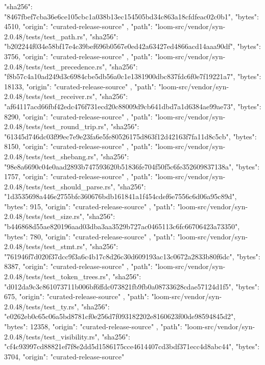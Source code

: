 {{      "sha256": "8467fbef7cba36e6ce105cbc1a038b13ec154505bd34c863a18cfdfeac02c0b1",
      "bytes": 4510,
      "origin": "curated-release-source"
    },
    {
      "path": "loom-src/vendor/syn-2.0.48/tests/test_path.rs",
      "sha256": "b202244f034e58bf17e4c39bef696b0567e0ed42a63427ed4866acd14aaa90df",
      "bytes": 3756,
      "origin": "curated-release-source"
    },
    {
      "path": "loom-src/vendor/syn-2.0.48/tests/test_precedence.rs",
      "sha256": "f8b57c4a10ad249d3c6984cbe5db56a0c1e1381900dbc837fdc6f0e7f19221a7",
      "bytes": 18133,
      "origin": "curated-release-source"
    },
    {
      "path": "loom-src/vendor/syn-2.0.48/tests/test_receiver.rs",
      "sha256": "af64117acd66fbf42edc476f731ecd20c88009d9cb641dbd7a1d6384ae99ae73",
      "bytes": 8290,
      "origin": "curated-release-source"
    },
    {
      "path": "loom-src/vendor/syn-2.0.48/tests/test_round_trip.rs",
      "sha256": "61345d746dc03f99ec7e9e23fa6e5fe80526175d863f12d42163f7fa11d8c5cb",
      "bytes": 8150,
      "origin": "curated-release-source"
    },
    {
      "path": "loom-src/vendor/syn-2.0.48/tests/test_shebang.rs",
      "sha256": "98e8a6690c04e0aad2893b747593620b51836fe704f50f5c6fe352609837138a",
      "bytes": 1757,
      "origin": "curated-release-source"
    },
    {
      "path": "loom-src/vendor/syn-2.0.48/tests/test_should_parse.rs",
      "sha256": "1d3535698a446e2755bfc360676bdb161841a1f454cdef6e7556c6d06a95c89d",
      "bytes": 915,
      "origin": "curated-release-source"
    },
    {
      "path": "loom-src/vendor/syn-2.0.48/tests/test_size.rs",
      "sha256": "b446868d55ae820196aad03dba3aa3529b727ac0465113c6fc66706423a73350",
      "bytes": 780,
      "origin": "curated-release-source"
    },
    {
      "path": "loom-src/vendor/syn-2.0.48/tests/test_stmt.rs",
      "sha256": "761946f7d020f37dcc9f3a6c4b17c8d26c30d609193ac13c0672a2833b80f6dc",
      "bytes": 8387,
      "origin": "curated-release-source"
    },
    {
      "path": "loom-src/vendor/syn-2.0.48/tests/test_token_trees.rs",
      "sha256": "d012da9c3c861073711b006bf6ffdc073821fb9fb0a08733628cdae57124d1f5",
      "bytes": 675,
      "origin": "curated-release-source"
    },
    {
      "path": "loom-src/vendor/syn-2.0.48/tests/test_ty.rs",
      "sha256": "e0262eb0c65c06a5bd8781cf0e256d7f093182202e8160623f00de98594845d2",
      "bytes": 12358,
      "origin": "curated-release-source"
    },
    {
      "path": "loom-src/vendor/syn-2.0.48/tests/test_visibility.rs",
      "sha256": "cf4c93997cd88821ef7f8e2dd5d1586175cce4614407cd3bdf371ecc4d8abc44",
      "bytes": 3704,
      "origin": "curated-release-source"
}}

